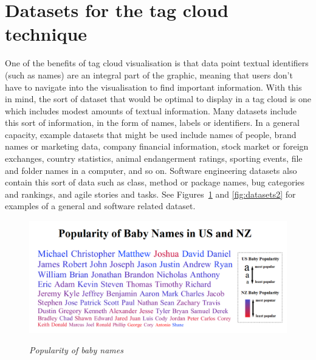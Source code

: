 \section{Datasets for the tag cloud technique}\label{sect:datasets}

One of the benefits of tag cloud visualisation is that data point textual identifiers (such as names) are an integral part of the graphic, meaning that users don't have to navigate into the visualisation to find important information. With this in mind, the sort of dataset that would be optimal to display in a tag cloud is one which includes modest amounts of textual information. Many datasets include this sort of information, in the form of names, labels or identifiers. In a general capacity, example datasets that might be used include names of people, brand names or marketing data, company financial information, stock market or foreign exchanges, country statistics, animal endangerment ratings, sporting events, file and folder names in a computer, and so on. Software engineering datasets also contain this sort of data such as class, method or package names, bug categories and rankings, and agile stories and tasks. See Figures~\ref{fig:datasets1} and \ref{fig:datasets2} for examples of a general and software related dataset.

\begin{figure}[!htb]
	\centering
	\includegraphics[scale=0.35]{babynames.png}
	\label{fig:babynames}
	\caption{\emph{Popularity of baby names}}
      \label{fig:datasets1}
\end{figure}

